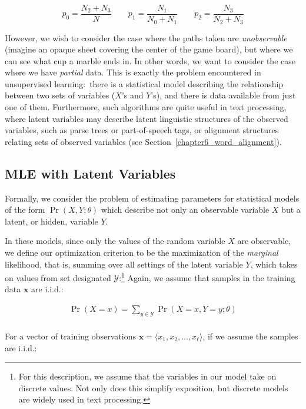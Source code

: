 \begin{equation}
p_0 = \frac{N_2 + N_3}{N} \quad \quad p_1 = \frac{N_1}{N_0 + N_1} \quad \quad  p_2 = \frac{N_3}{N_2 + N_3}
\end{equation}

\noindent However, we wish to consider the case where the paths taken
are \emph{unobservable} (imagine an opaque sheet covering the center
of the game board), but where we can see what cup a marble ends in.
In other words, we want to consider the case where we have
\emph{partial} data.  This is exactly the problem encountered in
unsupervised learning:\ there is a statistical model describing the
relationship between two sets of variables ($X$'s and $Y$'s), and
there is data available from just one of them.  Furthermore, such
algorithms are quite useful in text processing, where latent variables
may describe latent linguistic structures of the observed variables,
such as parse trees or part-of-speech tags, or alignment structures
relating sets of observed variables (see
Section~\ref{chapter6_word_alignment}).

\subsection{MLE with Latent Variables}

Formally, we consider the problem of estimating parameters for
statistical models of the form $\Pr(X,Y;\theta)$ which describe not
only an observable variable $X$ but a latent, or hidden, variable $Y$.

In these models, since only the values of the random variable $X$ are
observable, we define our optimization criterion to be the
maximization of the \emph{marginal} likelihood, that is, summing over
all settings of the latent variable $Y$, which takes on values from
set designated $\mathcal{Y}$:\footnote{For this description, we assume
  that the variables in our model take on discrete values.  Not only
  does this simplify exposition, but discrete models are widely used
  in text processing.} Again, we assume that samples in the training
data $\textbf{x}$ are i.i.d.:

\begin{eqnarray*}
\Pr(X=x) = \sum_{y \in \mathcal{Y}} \Pr(X=x,Y=y ; \theta) \\
\end{eqnarray*}

\noindent For a vector of training observations $\textbf{x} = \langle
x_1,x_2, \ldots, x_{\ell} \rangle $, if we assume the samples are
i.i.d.:

